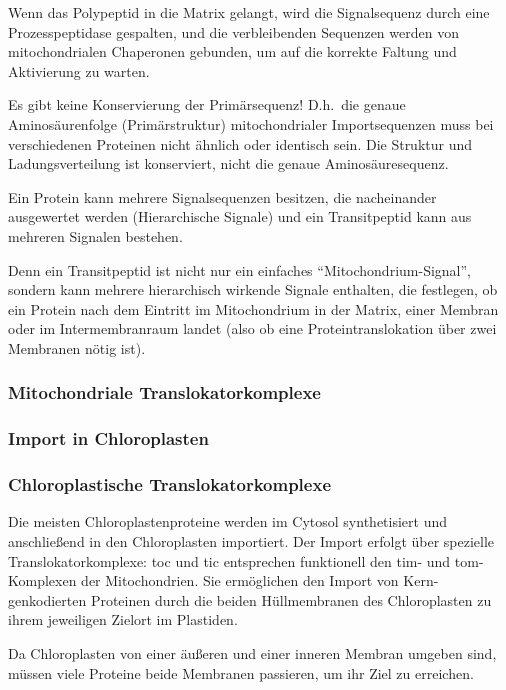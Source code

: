 Wenn das Polypeptid in die Matrix gelangt, wird die Signalsequenz durch eine Prozesspeptidase gespalten, und die
verbleibenden Sequenzen werden von mitochondrialen Chaperonen gebunden, um auf die korrekte Faltung und Aktivierung
zu warten. \cite{proteinSorting}

Es gibt keine Konservierung der Primärsequenz!
D.h.\ die genaue Aminosäurenfolge (Primärstruktur) mitochondrialer Importsequenzen muss bei verschiedenen
Proteinen nicht ähnlich oder identisch sein.
Die Struktur und Ladungsverteilung ist konserviert, nicht die genaue Aminosäuresequenz.

Ein Protein kann mehrere Signalsequenzen besitzen, die nacheinander ausgewertet werden (Hierarchische Signale) und
ein Transitpeptid kann aus mehreren Signalen bestehen.

Denn ein Transitpeptid ist nicht nur ein einfaches ``Mitochondrium-Signal'', sondern kann mehrere hierarchisch
wirkende Signale enthalten, die festlegen, ob ein Protein nach dem Eintritt im Mitochondrium in der Matrix, einer
Membran oder im Intermembranraum landet (also ob eine Proteintranslokation über zwei Membranen nötig ist).

\subsubsection*{Mitochondriale Translokatorkomplexe}

\subsubsection{Import in Chloroplasten}

\subsubsection*{Chloroplastische Translokatorkomplexe}
Die meisten Chloroplastenproteine werden im Cytosol synthetisiert und anschließend in den Chloroplasten importiert.
Der Import erfolgt über spezielle Translokatorkomplexe:
\gls{toc} und \gls{tic} entsprechen funktionell den \gls{tim}- und \gls{tom}-Komplexen der Mitochondrien.
Sie ermöglichen den Import von Kern-genkodierten Proteinen durch die beiden Hüllmembranen des Chloroplasten zu ihrem jeweiligen Zielort im Plastiden.

Da Chloroplasten von einer äußeren und einer inneren Membran umgeben sind, müssen viele Proteine beide Membranen passieren, um ihr Ziel zu erreichen.

